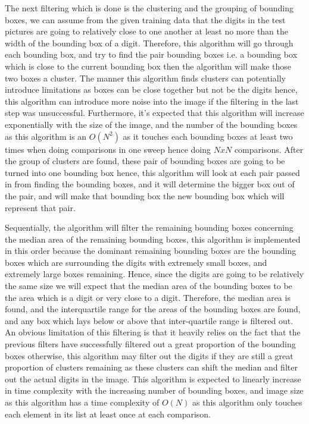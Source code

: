 \documentclass[
	12pt, %
]{fphw}
\begin{document}
The next filtering which is done is the clustering and the grouping of bounding boxes, we can assume from the given training data that the digits in the test pictures are going to relatively close to one another at least no more than the width of the bounding box of a digit. Therefore, this algorithm will go through each bounding box, and try to find the pair bounding boxes i.e. a bounding box which is close to the current bounding box then the algorithm will make those two boxes a cluster. The manner this algorithm finds clusters can potentially introduce limitations as boxes can be close together but not be the digits hence, this algorithm can introduce more noise into the image if the filtering in the last step was unsuccessful. Furthermore, it’s expected that this algorithm will increase exponentially with the size of the image, and the number of the bounding boxes as this algorithm is an $O(N^2)$ as it touches each bounding boxes at least two times when doing comparisons in one sweep hence doing $N x N$ comparisons. After the group of clusters are found, these pair of bounding boxes are going to be turned into one bounding box hence, this algorithm will look at each pair passed in from finding the bounding boxes, and it will determine the bigger box out of the pair, and will make that bounding box the new bounding box which will represent that pair. \par

Sequentially, the algorithm will filter the remaining bounding boxes concerning the median area of the remaining bounding boxes, this algorithm is implemented in this order because the dominant remaining bounding boxes are the bounding boxes which are surrounding the digits with extremely small boxes, and extremely large boxes remaining. Hence, since the digits are going to be relatively the same size we will expect that the median area of the bounding boxes to be the area which is a digit or very close to a digit. Therefore, the median area is found, and the interquartile range for the areas of the bounding boxes are found, and any box which lays below or above that inter-quartile range is filtered out. An obvious limitation of this filtering is that it heavily relies on the fact that the previous filters have successfully filtered out a great proportion of the bounding boxes otherwise, this algorithm may filter out the digits if they are still a great proportion of clusters remaining as these clusters can shift the median and filter out the actual digits in the image. This algorithm is expected to linearly increase in time complexity with the increasing number of bounding boxes, and image size as this algorithm has a time complexity of $O(N)$ as this algorithm only touches each element in its list at least once at each comparison. \par
\end{document}

